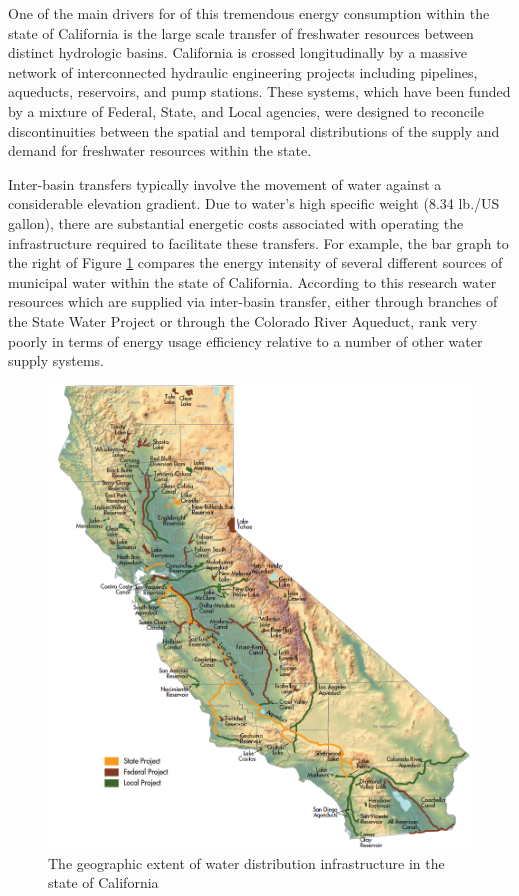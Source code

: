 One of the main drivers for of this tremendous energy consumption within the state of California is the large scale transfer of freshwater resources between distinct hydrologic basins. California is crossed longitudinally by a massive network of interconnected hydraulic engineering projects including pipelines, aqueducts, reservoirs, and pump stations. These systems, which have been funded by a mixture of Federal, State, and Local agencies, were designed to reconcile discontinuities between the spatial and temporal distributions of the supply and demand for freshwater resources within the state.
    
Inter-basin transfers typically involve the movement of water against a considerable elevation gradient. Due to water's high specific weight (8.34 lb./US gallon), there are substantial energetic costs associated with operating the infrastructure required to facilitate these transfers. For example, the bar graph to the right of Figure \ref{fig:infrastructure-energy-intensity} compares the energy intensity of several different sources of municipal water within the state of California. According to this research water resources which are supplied via inter-basin transfer, either through branches of the State Water Project or through the Colorado River Aqueduct, rank very poorly in terms of energy usage efficiency relative to a number of other water supply systems.
    
         \begin{figure}[The geographic extent of water distribution infrastructure in the state California]
       \centering
       \includegraphics[width=5.5in]{figures/infrastructure.png}
       \caption[Characteristics of Water Distribution Infrastructure]{The geographic extent of water distribution infrastructure in the state of California}
       \label{fig:infrastructure-energy-intensity}
     \end{figure}
    
